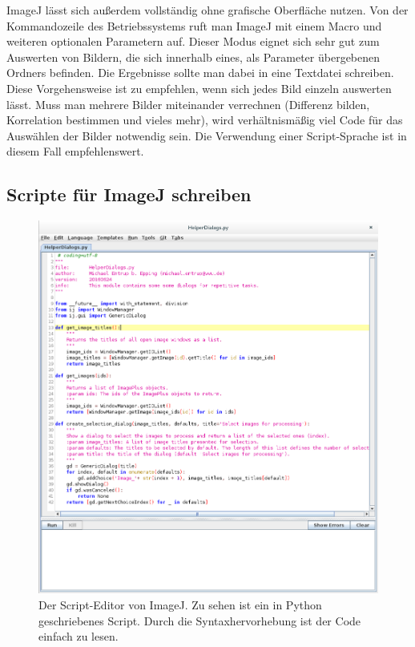 \documentclass[
	paper=a4,				%
	twoside=true,			%
	BCOR=6mm,				%
	fontsize=12pt,			%
	pagesize=auto,			%
	numbers=noenddot,		%
	bibliography=totoc,		%
	draft=false
]{scrartcl}
\begin{document}
ImageJ lässt sich außerdem vollständig ohne grafische Oberfläche nutzen. Von der Kommandozeile des Betriebssystems ruft man ImageJ mit einem Macro und weiteren optionalen Parametern auf. Dieser Modus eignet sich sehr gut zum Auswerten von Bildern, die sich innerhalb eines, als Parameter übergebenen Ordners befinden. Die Ergebnisse sollte man dabei in eine Textdatei schreiben. Diese Vorgehensweise ist zu empfehlen, wenn sich jedes Bild einzeln auswerten lässt. Muss man mehrere Bilder miteinander verrechnen (Differenz bilden, Korrelation bestimmen und vieles mehr), wird verhältnismäßig viel Code für das Auswählen der Bilder notwendig sein. Die Verwendung einer Script-Sprache ist in diesem Fall empfehlenswert.

\subsection*{Scripte für ImageJ schreiben}

\begin{figure}
	\centering
	\includegraphics[width=1\linewidth]{Bilder/ImageJ_Script_Editor}
	\caption{Der Script-Editor von ImageJ. Zu sehen ist ein in Python geschriebenes Script. Durch die Syntaxhervorhebung ist der Code einfach zu lesen.}
	\label{fig:ImageJ_Script_Editor}
\end{figure}
\end{document}

